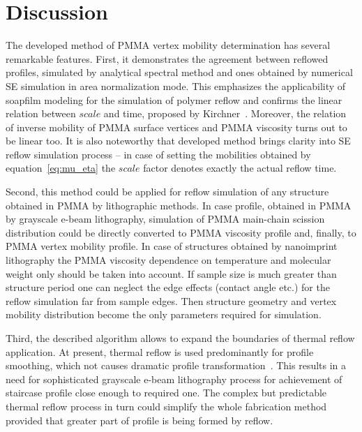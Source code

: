 \section{Discussion}

The developed method of PMMA vertex mobility determination has several remarkable features.
First, it demonstrates the agreement between reflowed profiles, simulated by analytical spectral method and ones obtained by numerical SE simulation in area normalization mode.
This emphasizes the applicability of soapfilm modeling for the simulation of polymer reflow and confirms the linear relation between $scale$ and time, proposed by Kirchner~\cite{Kirchner_SE_1}.
Moreover, the relation of inverse mobility of PMMA surface vertices and PMMA viscosity turns out to be linear too.
It is also noteworthy that developed method brings clarity into SE reflow simulation process -- in case of setting the mobilities obtained by equation~\ref{eq:mu_eta} the $scale$ factor denotes exactly the actual reflow time.

Second, this method could be applied for reflow simulation of any structure obtained in PMMA by lithographic methods.
In case profile, obtained in PMMA by grayscale e-beam lithography, simulation of PMMA main-chain scission distribution could be directly converted to PMMA viscosity profile and, finally, to PMMA vertex mobility profile.
In case of structures obtained by nanoimprint lithography the PMMA viscosity dependence on temperature and molecular weight only should be taken into account.
If sample size is much greater than structure period one can neglect the edge effects (contact angle etc.) for the reflow simulation far from sample edges.
Then structure geometry and vertex mobility distribution become the only parameters required for simulation.

Third, the described algorithm allows to expand the boundaries of thermal reflow application. At present, thermal reflow is used predominantly for profile smoothing, which not causes dramatic profile transformation~\cite{Kirchner_GL_review,Kirchner_2017}.
This results in a need for sophisticated grayscale e-beam lithography process for achievement of staircase profile close enough to required one.
The complex but predictable thermal reflow process in turn could simplify the whole fabrication method provided that greater part of profile is being formed by reflow.

